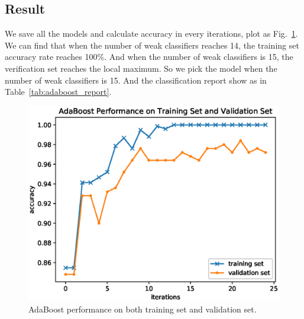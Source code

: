 \documentclass[journal, a4paper]{IEEEtran}
\begin{document}
\subsection{Result}
    We save all the models and calculate accuracy in every iterations, plot as Fig.~\ref{fig:adaboost_accuracy}.
    We can find that when the number of weak classifiers reaches 14, the training set accuracy rate reaches 100\%. And when the number of weak classifiers is 15, the verification set reaches the local maximum. So we pick the model when the number of weak classifiers is 15. And the classification report show as in Table~\ref{tab:adaboost_report}.

    \begin{figure}[!hbt]
		\begin{center}
		\includegraphics[width=\columnwidth]{adaboost_accuracy}
		\caption{AdaBoost performance on both training set and validation set.}
		\label{fig:adaboost_accuracy}
		\end{center}
	\end{figure}
\end{document}
